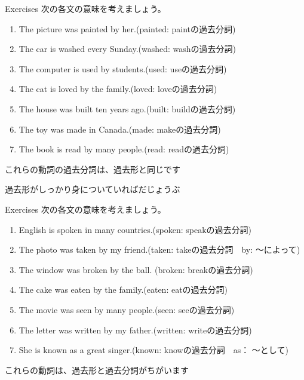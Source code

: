 \documentclass[aspectratio=169,xcolor={dvipsnames,table}]{beamer}
\begin{document}
\begin{frame}[plain]{Exercises}
 次の各文の意味を考えましょう。

\begin{enumerate}
 \item The picture was painted by her.\hfill{}(painted: paintの過去分詞)
 \item The car is washed every Sunday.\hfill{}(washed: washの過去分詞)
 \item The computer is used by students.\hfill{}(used: useの過去分詞)
 \item The cat is loved by the family.\hfill{}(loved: loveの過去分詞)
 \item The house was built ten years ago.\hfill{}(built: buildの過去分詞)
 \item The toy was made in Canada.\hfill{}(made: makeの過去分詞)
 \item The book is read by many people.\hfill{}(read: readの過去分詞)
\end{enumerate}

\pause

これらの動詞の過去分詞は、過去形と同じです

\vspace{-5pt}

過去形がしっかり身についていればだじょうぶ
\end{frame}

\begin{frame}[plain]{Exercises}
 次の各文の意味を考えましょう。

 \begin{enumerate}
\item English is spoken in many countries.\hfill{}(spoken: speakの過去分詞)
\item The photo was taken by my friend.\hfill{}(taken: takeの過去分詞　by: 〜によって)
\item The window was broken by the ball.\hfill{} (broken: breakの過去分詞)
\item The cake was eaten by the family.\hfill{}(eaten: eatの過去分詞)
\item The movie was seen by many people.\hfill{}(seen: seeの過去分詞)
\item The letter was written by my father.\hfill{}(written: writeの過去分詞)
\item She is known as a great singer.\hfill{}(known: knowの過去分詞　as： 〜として)
\end{enumerate}

\pause

これらの動詞は、過去形と過去分詞がちがいます

\end{frame}
\end{document}
